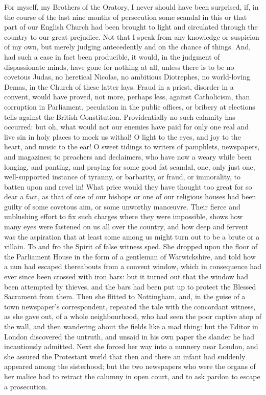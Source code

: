 For myself, my Brothers of the Oratory, I never should
have been surprised, if, in the course of the last nine
months of persecution some scandal in this or that part
of our English Church had been brought to light and
circulated through the country to our great prejudice.
Not that I speak from any knowledge or suspicion of my
own, but merely judging antecedently and on the chance of
things. And, had such a case in fact been producible, it
would, in the judgment of dispassionate minds, have gone
for nothing at all, unless there is to be no covetous
Judas, no heretical Nicolas, no ambitious Diotrephes, no
world-loving Demas, in the Church of these latter lays.
Fraud in a priest, disorder in a convent, would have
proved, not more, perhaps less, against Catholicism, than
corruption in Parliament, peculation in the public
offices, or bribery at elections tells against the
British Constitution. Providentially no such calamity has
occurred: but oh, what would not our enemies have paid
for only one real and live sin in holy places to mock us
withal! O light to the eyes, and joy to the heart, and
music to the ear! O sweet tidings to writers of
pamphlets, newspapers, and magazines; to preachers and
declaimers, who have now a weary while been longing, and
panting, and praying for some good fat scandal, one, only
just one, well-supported instance of tyranny, or
barbarity, or fraud, or immorality, to batten upon and
revel in! What price would they have thought too great
for so dear a fact, as that of one of our bishops or one
of our religious houses had been guilty of some covetous
aim, or some unworthy manœuvre. Their fierce and
unblushing effort to fix such charges where they were
impossible, shows how many eyes were fastened on us all
over the country, and how deep and fervent was the
aspiration that at least some among us might turn out to
be a brute or a villain. To and fro the Spirit of false
witness sped. She dropped upon the floor of the
Parliament House in the form of a gentleman of
Warwickshire, and told how a nun had escaped thereabouts
from a convent window, which in consequence had ever
since been crossed with iron bars: but it turned out that
the window had been attempted by thieves, and the bars
had been put up to protect the Blessed Sacrament from
them. Then she flitted to Nottingham, and, in the guise
of a town newspaper's correspondent, repeated the tale
with the concordant witness, as she gave out, of a whole
neighbourhood, who had seen the poor captive atop of the
wall, and then wandering about the fields like a mad
thing: but the Editor in London discovered the untruth,
and unsaid in his own paper the slander he had
incautiously admitted. Next she forced her way into a
nunnery near London, and she assured the Protestant world
that then and there an infant had suddenly appeared among
the sisterhood; but the two newspapers who were the
organs of her malice had to retract the calumny in open
court, and to ask pardon to escape a prosecution.

